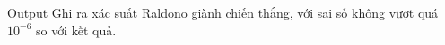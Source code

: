 Output
Ghi ra xác suất Raldono giành chiến thắng, với sai số không vượt quá $10^{-6}$ so với kết quả.